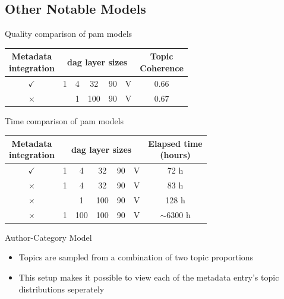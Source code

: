 \subsection{Other Notable Models}

\begin{frame}{\insertsubsection}{Quality comparison of \acrshort{pam} models}
	\centering
	\begin{tabular}{c|c|c|c|c|c|c}
		\makecell{Metadata \\ integration} & \multicolumn{5}{c}{\gls{dag} layer sizes} \vline & \makecell{Topic \\ Coherence} \\
		\hline
		$\checkmark$ & 1 & 4 & 32 & 90 & V & $0.66$\\
		$\times$ & & 1 & 100 & 90 & V & $0.67$ \\
	\end{tabular}
\end{frame}


\begin{frame}{\insertsubsection}{Time comparison of \acrshort{pam} models}
	\begin{tabular}{c|c|c|c|c|c|c}
		\makecell{Metadata \\ integration} & \multicolumn{5}{c}{\gls{dag} layer sizes} \vline & \makecell{Elapsed time \\ (hours)} \\
		\hline
		$\checkmark$ & 1 & 4 & 32 & 90 & V & 72 h\\
		$\times$ & 1 & 4 & 32 & 90 & V & 83 h\\
		$\times$ & & 1 & 100 & 90 & V &  128 h\\
		$\times$ & 1 & 100 & 100 & 90 & V & $\sim 6300$ h\\
	\end{tabular}
\end{frame}

\begin{frame}{\insertsubsection}{Author-Category Model}
	\begin{figure}
		\centering
		\resizebox{0.3\columnwidth}{!}{%
			
		}
	\end{figure}
	\begin{itemize}
		\item<1-> Topics are sampled from a combination of two topic proportions
		\item<2-> This setup makes it possible to view each of the metadata entry's topic distributions seperately
	\end{itemize}
\end{frame}


